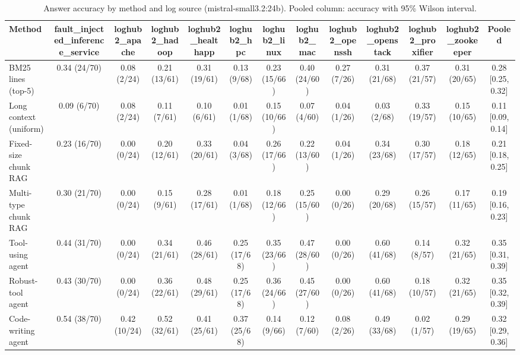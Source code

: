 \begin{table}[t]
\centering
\caption{Answer accuracy by method and log source (mistral-small3.2:24b). Pooled column: accuracy with 95\% Wilson interval.}
\label{tab:main_comparison__mistral_small_3_2_24b}
\begin{tabular}{@{}lcccccccccccc@{}}
\toprule
Method & fault\_injected\_inference\_service & loghub2\_apache & loghub2\_hadoop & loghub2\_healthapp & loghub2\_hpc & loghub2\_linux & loghub2\_mac & loghub2\_openssh & loghub2\_openstack & loghub2\_proxifier & loghub2\_zookeeper & Pooled \\
\midrule
BM25 lines (top-5) & 0.34 (24/70) & 0.08 (2/24) & 0.21 (13/61) & 0.31 (19/61) & 0.13 (9/68) & 0.23 (15/66) & 0.40 (24/60) & 0.27 (7/26) & 0.31 (21/68) & 0.37 (21/57) & 0.31 (20/65) & 0.28 [0.25, 0.32] \\
Long context (uniform) & 0.09 (6/70) & 0.08 (2/24) & 0.11 (7/61) & 0.10 (6/61) & 0.01 (1/68) & 0.15 (10/66) & 0.07 (4/60) & 0.04 (1/26) & 0.03 (2/68) & 0.33 (19/57) & 0.15 (10/65) & 0.11 [0.09, 0.14] \\
Fixed-size chunk RAG & 0.23 (16/70) & 0.00 (0/24) & 0.20 (12/61) & 0.33 (20/61) & 0.04 (3/68) & 0.26 (17/66) & 0.22 (13/60) & 0.04 (1/26) & 0.34 (23/68) & 0.30 (17/57) & 0.18 (12/65) & 0.21 [0.18, 0.25] \\
Multi-type chunk RAG & 0.30 (21/70) & 0.00 (0/24) & 0.15 (9/61) & 0.28 (17/61) & 0.01 (1/68) & 0.18 (12/66) & 0.25 (15/60) & 0.00 (0/26) & 0.29 (20/68) & 0.26 (15/57) & 0.17 (11/65) & 0.19 [0.16, 0.23] \\
Tool-using agent & 0.44 (31/70) & 0.00 (0/24) & 0.34 (21/61) & 0.46 (28/61) & 0.25 (17/68) & 0.35 (23/66) & 0.47 (28/60) & 0.00 (0/26) & 0.60 (41/68) & 0.14 (8/57) & 0.32 (21/65) & 0.35 [0.31, 0.39] \\
Robust-tool agent & 0.43 (30/70) & 0.00 (0/24) & 0.36 (22/61) & 0.48 (29/61) & 0.25 (17/68) & 0.36 (24/66) & 0.45 (27/60) & 0.00 (0/26) & 0.60 (41/68) & 0.18 (10/57) & 0.32 (21/65) & 0.35 [0.32, 0.39] \\
Code-writing agent & 0.54 (38/70) & 0.42 (10/24) & 0.52 (32/61) & 0.41 (25/61) & 0.37 (25/68) & 0.14 (9/66) & 0.12 (7/60) & 0.08 (2/26) & 0.49 (33/68) & 0.02 (1/57) & 0.29 (19/65) & 0.32 [0.29, 0.36] \\
\bottomrule
\end{tabular}
\end{table}

